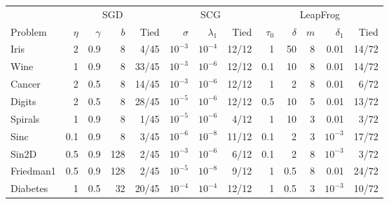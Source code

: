 \begin{tabular}{@{}l rrrr rrr rrrrr@{}}
\toprule
& \multicolumn{4}{c}{SGD} & \multicolumn{3}{c}{SCG} & \multicolumn{5}{c}{LeapFrog} \\\cmidrule(lr){2-5}\cmidrule(lr){6-8}\cmidrule(l){9-13}Problem & $\eta$ & $\gamma$ & $b$ & Tied & $\sigma$ & $\lambda_1$ & Tied & $\tau_0$ & $\delta$ & $m$ & $\delta_1$ & Tied \\
\midrule
Iris & 2 & 0.9 & 8 & 4/45 & $10^{-3}$ & $10^{-4}$ & 12/12 & 1 & 50 & 8 & 0.01 & 14/72 \\
Wine & 1 & 0.9 & 8 & 33/45 & $10^{-3}$ & $10^{-6}$ & 12/12 & 0.1 & 10 & 8 & 0.01 & 14/72 \\
Cancer & 2 & 0.5 & 8 & 14/45 & $10^{-3}$ & $10^{-6}$ & 12/12 & 1 & 2 & 8 & 0.01 & 6/72 \\
Digits & 2 & 0.5 & 8 & 28/45 & $10^{-5}$ & $10^{-6}$ & 12/12 & 0.5 & 10 & 5 & 0.01 & 13/72 \\
Spirals & 1 & 0.9 & 8 & 1/45 & $10^{-5}$ & $10^{-6}$ & 4/12 & 1 & 10 & 3 & 0.01 & 3/72 \\
Sinc & 0.1 & 0.9 & 8 & 3/45 & $10^{-6}$ & $10^{-8}$ & 11/12 & 0.1 & 2 & 3 & $10^{-3}$ & 17/72 \\
Sin2D & 0.5 & 0.9 & 128 & 2/45 & $10^{-3}$ & $10^{-6}$ & 6/12 & 0.1 & 2 & 8 & $10^{-3}$ & 3/72 \\
Friedman1 & 0.5 & 0.9 & 128 & 2/45 & $10^{-5}$ & $10^{-8}$ & 9/12 & 1 & 0.5 & 8 & 0.01 & 24/72 \\
Diabetes & 1 & 0.5 & 32 & 20/45 & $10^{-4}$ & $10^{-4}$ & 12/12 & 1 & 0.5 & 3 & $10^{-3}$ & 10/72 \\
\bottomrule
\end{tabular}
